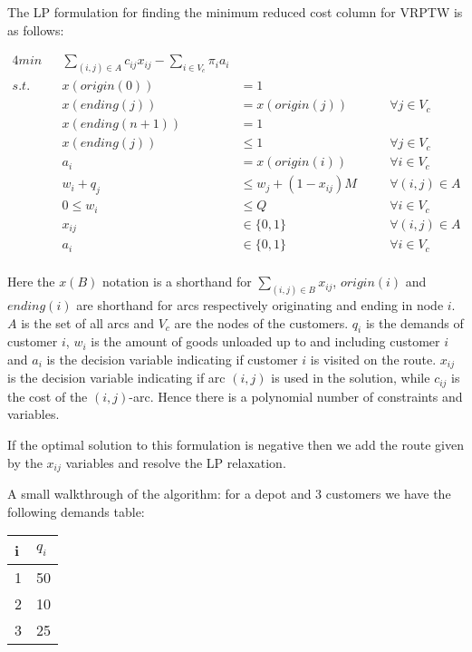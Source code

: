 The LP formulation for finding the minimum reduced cost column for VRPTW is as follows:

\begin{alignat}{4}
min     && \sum_{(i,j) \in A} c_{ij} x_{ij} - \sum_{i \in V_c} \pi_i a_i \\
s.t.    && x(origin(0))      & = 1 \\
        && x(ending(j))      & = x(origin(j))               && \forall j \in V_c \\
        && x(ending(n+1))    & = 1 \\
        && x(ending(j))      & \leq 1                       && \forall j \in V_c \\
        && a_i               & = x(origin(i))               && \forall i \in V_c \\
        && w_i + q_j         & \leq w_j + (1-x_{ij})M \quad && \forall (i,j) \in A \\
        && 0 \leq w_i        & \leq Q                       && \forall i \in V_c \\
        && x_{ij}            & \in \{0,1\}                  && \forall (i,j) \in A \\
        && a_{i}             & \in \{0,1\}                  && \forall i \in V_c \\
\end{alignat}

Here the $x(B)$ notation is a shorthand for $\sum_{(i,j) \in B} x_{ij}$, $origin(i)$ and $ending(i)$ are shorthand for arcs respectively originating and ending in node $i$. $A$ is the set of all arcs and $V_c$ are the nodes of the customers. $q_i$ is the demands of customer $i$, $w_i$ is the amount of goods unloaded up to and including customer $i$ and $a_i$ is the decision variable indicating if customer $i$ is visited on the route. $x_{ij}$ is the decision variable indicating if arc $(i,j)$ is used in the solution, while $c_{ij}$ is the cost of the $(i,j)$-arc. Hence there is a polynomial number of constraints and variables. 

If the optimal solution to this formulation is negative then we add the route given by the $x_{ij}$ variables and resolve the LP relaxation.

\newpar A small walkthrough of the algorithm: for a depot and 3 customers we have the following demands table:

\begin{tabular}{|l|l|}
\hline
i & $q_i$    \\\hline
1 & 50       \\\hline
2 & 10       \\\hline
3 & 25       \\\hline
\end{tabular}

